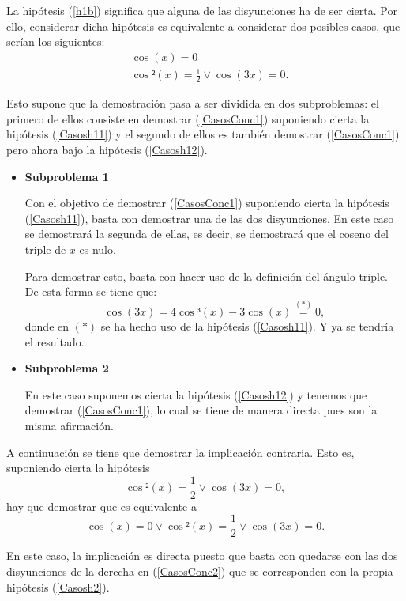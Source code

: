 \begin{demostracion}
  La hipótesis (\ref{h1b}) significa que alguna de las disyunciones
  ha de ser cierta. Por ello, considerar dicha hipótesis es
  equivalente a considerar dos posibles casos, que serían los
  siguientes:
  \begin{align}
    &\cos(x)=0 \label{Casosh11}\tag{h11}\\
    &\cos²(x)=\frac{1}{2}\lor \cos(3x)=0. \label{Casosh12}\tag{h12}
  \end{align}

  Esto supone que la demostración pasa a ser dividida en
  dos subproblemas: el primero de
  ellos consiste en demostrar (\ref{CasosConc1}) suponiendo
  cierta la hipótesis (\ref{Casosh11}) y el segundo de ellos
  es también demostrar (\ref{CasosConc1}) pero ahora bajo la
  hipótesis (\ref{Casosh12}).

  \begin{itemize}
  \item \textbf{Subproblema 1}

    Con el objetivo de demostrar (\ref{CasosConc1}) suponiendo
    cierta la hipótesis (\ref{Casosh11}), basta con demostrar una
    de las dos disyunciones. En este caso se demostrará la segunda
    de ellas, es decir, se demostrará que el coseno del triple de
    \(x\) es nulo.

    Para demostrar esto, basta con hacer uso de la definición del
    ángulo triple. De esta forma se tiene que:
    \begin{equation}
      \cos(3x)=4\cos³(x)-3\cos(x)\stackrel{(*)}{=}0,
    \end{equation}
    donde en \((*)\) se ha hecho uso de la hipótesis
    (\ref{Casosh11}). Y ya se tendría el resultado.

  \item \textbf{Subproblema 2}

    En este caso suponemos cierta la hipótesis (\ref{Casosh12})
    y tenemos que demostrar (\ref{CasosConc1}), lo cual se tiene
    de manera directa pues son la misma afirmación.
  \end{itemize}

  \noindent
  \framebox{\longleftarrow} A continuación se tiene que demostrar
  la implicación contraria. Esto es, suponiendo cierta la
  hipótesis
  \begin{equation}\label{Casosh2}\tag{h2}
    \cos²(x)=\frac{1}{2} \lor \cos(3x)=0,
  \end{equation}
  hay que demostrar que es equivalente a
  \begin{equation}\label{CasosConc2}
    \cos(x)=0 \lor \cos²(x)=\frac{1}{2}\lor \cos(3x)=0.
  \end{equation}

  En este caso, la implicación es directa puesto que basta con
  quedarse con las dos disyunciones de la derecha en
  (\ref{CasosConc2}) que se corresponden con la propia hipótesis
  (\ref{Casosh2}).
\end{demostracion}

